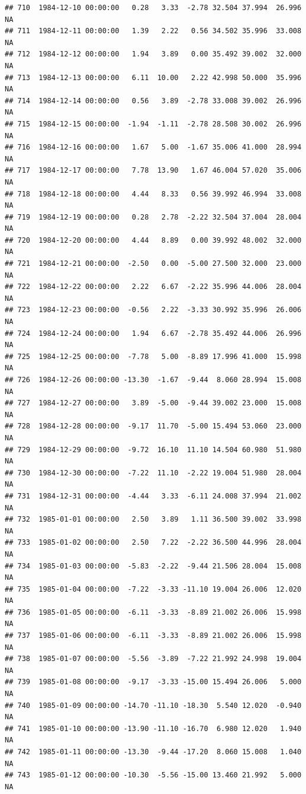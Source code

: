 \documentclass{article}\usepackage{graphicx, color}
\makeatletter
\newenvironment{kframe}{%
 \def\at@end@of@kframe{}%
 \ifinner\ifhmode%
  \def\at@end@of@kframe{\end{minipage}}%
  \begin{minipage}{\columnwidth}%
 \fi\fi%
 \def\FrameCommand##1{\hskip\@totalleftmargin \hskip-\fboxsep
 \colorbox{shadecolor}{##1}\hskip-\fboxsep
     \hskip-\linewidth \hskip-\@totalleftmargin \hskip\columnwidth}%
 \MakeFramed {\advance\hsize-\width
   \@totalleftmargin\z@ \linewidth\hsize
   \@setminipage}}%
 {\par\unskip\endMakeFramed%
 \at@end@of@kframe}
\newenvironment{knitrout}{}{} %
\makeatother
\begin{document}
\begin{knitrout}
\begin{kframe}
\begin{verbatim}
## 710  1984-12-10 00:00:00   0.28   3.33  -2.78 32.504 37.994  26.996     NA
## 711  1984-12-11 00:00:00   1.39   2.22   0.56 34.502 35.996  33.008     NA
## 712  1984-12-12 00:00:00   1.94   3.89   0.00 35.492 39.002  32.000     NA
## 713  1984-12-13 00:00:00   6.11  10.00   2.22 42.998 50.000  35.996     NA
## 714  1984-12-14 00:00:00   0.56   3.89  -2.78 33.008 39.002  26.996     NA
## 715  1984-12-15 00:00:00  -1.94  -1.11  -2.78 28.508 30.002  26.996     NA
## 716  1984-12-16 00:00:00   1.67   5.00  -1.67 35.006 41.000  28.994     NA
## 717  1984-12-17 00:00:00   7.78  13.90   1.67 46.004 57.020  35.006     NA
## 718  1984-12-18 00:00:00   4.44   8.33   0.56 39.992 46.994  33.008     NA
## 719  1984-12-19 00:00:00   0.28   2.78  -2.22 32.504 37.004  28.004     NA
## 720  1984-12-20 00:00:00   4.44   8.89   0.00 39.992 48.002  32.000     NA
## 721  1984-12-21 00:00:00  -2.50   0.00  -5.00 27.500 32.000  23.000     NA
## 722  1984-12-22 00:00:00   2.22   6.67  -2.22 35.996 44.006  28.004     NA
## 723  1984-12-23 00:00:00  -0.56   2.22  -3.33 30.992 35.996  26.006     NA
## 724  1984-12-24 00:00:00   1.94   6.67  -2.78 35.492 44.006  26.996     NA
## 725  1984-12-25 00:00:00  -7.78   5.00  -8.89 17.996 41.000  15.998     NA
## 726  1984-12-26 00:00:00 -13.30  -1.67  -9.44  8.060 28.994  15.008     NA
## 727  1984-12-27 00:00:00   3.89  -5.00  -9.44 39.002 23.000  15.008     NA
## 728  1984-12-28 00:00:00  -9.17  11.70  -5.00 15.494 53.060  23.000     NA
## 729  1984-12-29 00:00:00  -9.72  16.10  11.10 14.504 60.980  51.980     NA
## 730  1984-12-30 00:00:00  -7.22  11.10  -2.22 19.004 51.980  28.004     NA
## 731  1984-12-31 00:00:00  -4.44   3.33  -6.11 24.008 37.994  21.002     NA
## 732  1985-01-01 00:00:00   2.50   3.89   1.11 36.500 39.002  33.998     NA
## 733  1985-01-02 00:00:00   2.50   7.22  -2.22 36.500 44.996  28.004     NA
## 734  1985-01-03 00:00:00  -5.83  -2.22  -9.44 21.506 28.004  15.008     NA
## 735  1985-01-04 00:00:00  -7.22  -3.33 -11.10 19.004 26.006  12.020     NA
## 736  1985-01-05 00:00:00  -6.11  -3.33  -8.89 21.002 26.006  15.998     NA
## 737  1985-01-06 00:00:00  -6.11  -3.33  -8.89 21.002 26.006  15.998     NA
## 738  1985-01-07 00:00:00  -5.56  -3.89  -7.22 21.992 24.998  19.004     NA
## 739  1985-01-08 00:00:00  -9.17  -3.33 -15.00 15.494 26.006   5.000     NA
## 740  1985-01-09 00:00:00 -14.70 -11.10 -18.30  5.540 12.020  -0.940     NA
## 741  1985-01-10 00:00:00 -13.90 -11.10 -16.70  6.980 12.020   1.940     NA
## 742  1985-01-11 00:00:00 -13.30  -9.44 -17.20  8.060 15.008   1.040     NA
## 743  1985-01-12 00:00:00 -10.30  -5.56 -15.00 13.460 21.992   5.000     NA

\end{verbatim}
\end{kframe}
\end{knitrout}
\end{document}
